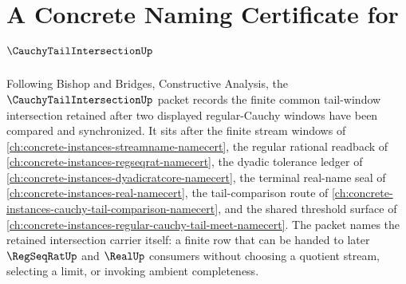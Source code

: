 \chapter{A Concrete Naming Certificate for $\CauchyTailIntersectionUp$}
\label{ch:concrete-instances-cauchy-tail-intersection-namecert}

Following Bishop and Bridges, Constructive Analysis, the $\CauchyTailIntersectionUp$ packet records the finite common tail-window intersection retained after two displayed regular-Cauchy windows have been compared and synchronized. It sits after the finite stream windows of \autoref{ch:concrete-instances-streamname-namecert}, the regular rational readback of \autoref{ch:concrete-instances-regseqrat-namecert}, the dyadic tolerance ledger of \autoref{ch:concrete-instances-dyadicratcore-namecert}, the terminal real-name seal of \autoref{ch:concrete-instances-real-namecert}, the tail-comparison route of \autoref{ch:concrete-instances-cauchy-tail-comparison-namecert}, and the shared threshold surface of \autoref{ch:concrete-instances-regular-cauchy-tail-meet-namecert}. The packet names the retained intersection carrier itself: a finite row that can be handed to later $\RegSeqRatUp$ and $\RealUp$ consumers without choosing a quotient stream, selecting a limit, or invoking ambient completeness.

